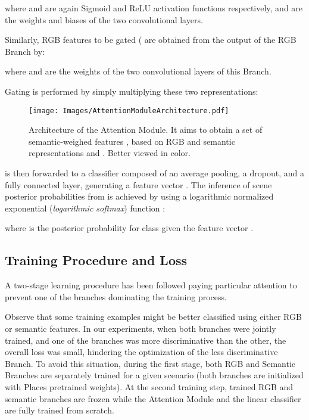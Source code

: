 \documentclass[review, 3p, sort&compress]{elsarticle}
\begin{document}
where  and  are again Sigmoid and ReLU activation functions respectively,  and  are the weights and biases of the two convolutional layers. 

Similarly, RGB features to be gated ( are obtained from the output of the RGB Branch  by:



where  and  are the weights of the two convolutional layers of this Branch.

Gating is performed by simply multiplying these two representations:


\begin{figure}[t!]
    \centering
    \texttt{[image: Images/AttentionModuleArchitecture.pdf]}
    \caption{Architecture of the Attention Module. It aims to obtain a set of semantic-weighed features , based on RGB and semantic representations  and . Better viewed in color.}
    \label{fig:Attention Module Architecture}
\end{figure}

 is then forwarded to a classifier composed of an average pooling, a dropout, and a fully connected layer, generating a feature vector .
The inference of scene posterior probabilities  from  is achieved by using a logarithmic normalized exponential (\textit{logarithmic softmax}) function :


where  is the posterior probability for class  given the feature vector .

\subsection{Training Procedure and Loss} \label{subsec:Training Procedure and Loss}
A two-stage learning procedure has been followed paying particular attention to prevent one of the branches dominating the training process.

Observe that some training examples might be better classified using either RGB or semantic features. In our experiments, when both branches were jointly trained, and one of the branches was more discriminative than the other, the overall loss was small, hindering the optimization of the less discriminative Branch. To avoid this situation, during the first stage, both RGB and Semantic Branches are separately trained for a given scenario (both branches are initialized with Places pretrained weights). At the second training step, trained RGB and semantic branches are frozen while the Attention Module and the linear classifier are fully trained from scratch.
\end{document}
